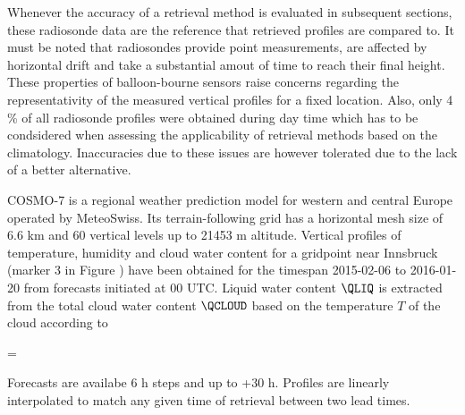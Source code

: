     Whenever the accuracy of a retrieval method is evaluated in subsequent
    sections, these radiosonde data are the reference that retrieved profiles
    are compared to. It must be noted that radiosondes provide point
    measurements, are affected by horizontal drift and take a substantial amout
    of time to reach their final height. These properties of balloon-bourne
    sensors raise concerns regarding the representativity of the measured
    vertical profiles for a fixed location. Also, only 4 \% of all radiosonde
    profiles were obtained during day time which has to be condsidered when
    assessing the applicability of retrieval methods based on the climatology.
    Inaccuracies due to these issues are however tolerated due to the lack of
    a better alternative.

            {}

\stopsection


\startsection[title=COSMO-7 Simulated Soundings]

    COSMO-7 is a regional weather prediction model for western and central
    Europe operated by MeteoSwiss. Its terrain-following grid has a
    horizontal mesh size of 6.6 km and 60 vertical levels up to 21453
    m altitude. Vertical profiles of temperature, humidity and cloud water
    content for a gridpoint near Innsbruck (marker 3 in Figure
    ) have been obtained for the timespan 2015-02-06 to
    2016-01-20 from forecasts initiated at 00 UTC. Liquid water content
    $\QLIQ$ is extracted from the total cloud water content $\QCLOUD$ based on
    the temperature $T$ of the cloud according to

    \startformula
        \QLIQ = \QCLOUD \startcases
              \, \KELVIN \le \TEMP \NR
            \NC {}
                 \, \KELVIN \lt \TEMP {} \, \KELVIN \EQSTOP \NR
              \, \KELVIN \le \TEMP \NR
        \stopcases
    \stopformula

    Forecasts are availabe 6 h steps and up to +30 h. Profiles are linearly
    interpolated to match any given time of retrieval between two lead times.


